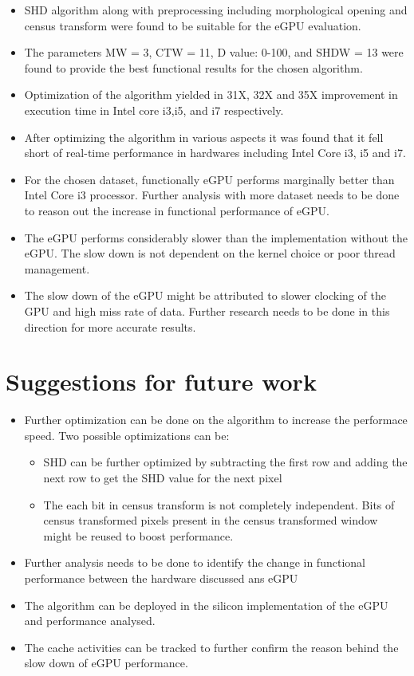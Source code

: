 \begin{itemize}
\item{SHD algorithm along with preprocessing including morphological opening and census transform were found to be suitable for the eGPU evaluation.}
\item{The parameters MW = 3, CTW = 11, D value: 0-100, and SHDW = 13 were found to provide the best functional results for the chosen algorithm.}
\item{Optimization of the algorithm yielded in 31X, 32X and 35X improvement in execution time in Intel core i3,i5, and i7 respectively.}
\item{After optimizing the algorithm in various aspects it was found that it fell short of real-time performance in hardwares including Intel Core i3, i5 and i7.}
\item{For the chosen dataset, functionally eGPU performs marginally better than Intel Core i3 processor. Further analysis with more dataset needs to be done to reason out the increase in functional performance of eGPU.}
\item{The eGPU performs considerably slower than the implementation without the eGPU. The slow down is not dependent on the kernel choice or poor thread management.}
\item{The slow down of the eGPU might be attributed to slower clocking of the GPU and high miss rate of data. Further research needs to be done in this direction for more accurate results.}
\end{itemize}

%

\section{Suggestions for future work}
\begin{itemize}
	\item{Further optimization can be done on the algorithm to increase the performace speed. Two possible optimizations can be:}
	\begin{itemize}
		\item{SHD can be further optimized by subtracting the first row and adding the next row to get the SHD value for the next pixel}
		\item{The each bit in census transform is not completely independent. Bits of census transformed pixels present in the census transformed window might be reused to boost performance.}
	\end{itemize}
	\item{Further analysis needs to be done to identify the change in functional performance between the hardware discussed ans eGPU}
	\item{The algorithm can be deployed in the silicon implementation of the eGPU and performance analysed.}
	\item{The cache activities can be tracked to further confirm the reason behind the slow down of eGPU performance.}
\end{itemize}